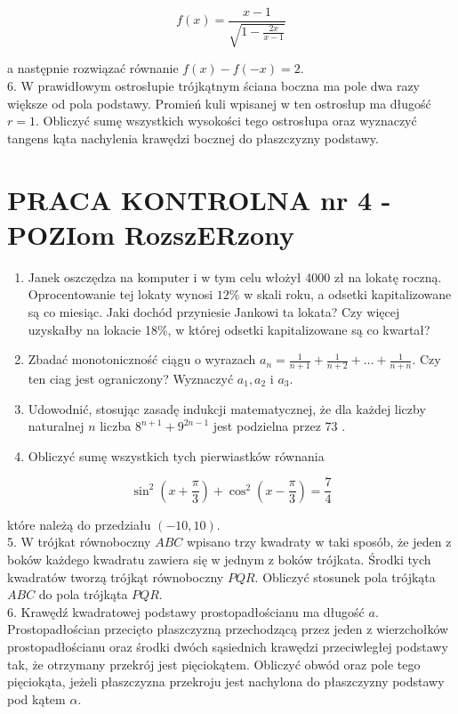 \documentclass[10pt]{article}
\begin{document}
$$
f(x)=\frac{x-1}{\sqrt{1-\frac{2 x}{x-1}}}
$$

a następnie rozwiązać równanie $f(x)-f(-x)=2$.\\
6. W prawidłowym ostrosłupie trójkątnym ściana boczna ma pole dwa razy większe od pola podstawy. Promień kuli wpisanej w ten ostrosłup ma długość $r=1$. Obliczyć sumę wszystkich wysokości tego ostrosłupa oraz wyznaczyć tangens kąta nachylenia krawędzi bocznej do płaszczyzny podstawy.

\section*{PRACA KONTROLNA nr 4 - POZIom RozszERzony}
\begin{enumerate}
  \item Janek oszczędza na komputer i w tym celu włożył 4000 zł na lokatę roczną. Oprocentowanie tej lokaty wynosi $12 \%$ w skali roku, a odsetki kapitalizowane są co miesiąc. Jaki dochód przyniesie Jankowi ta lokata? Czy więcej uzyskałby na lokacie 18\%, w której odsetki kapitalizowane są co kwartał?
  \item Zbadać monotoniczność ciągu o wyrazach $a_{n}=\frac{1}{n+1}+\frac{1}{n+2}+\ldots+\frac{1}{n+n}$. Czy ten ciag jest ograniczony? Wyznaczyć $a_{1}, a_{2}$ i $a_{3}$.
  \item Udowodnić, stosując zasadę indukcji matematycznej, że dla każdej liczby naturalnej $n$ liczba $8^{n+1}+9^{2 n-1}$ jest podzielna przez 73 .
  \item Obliczyć sumę wszystkich tych pierwiastków równania
\end{enumerate}

$$
\sin ^{2}\left(x+\frac{\pi}{3}\right)+\cos ^{2}\left(x-\frac{\pi}{3}\right)=\frac{7}{4}
$$

które należą do przedziału $(-10,10)$.\\
5. W trójkat równoboczny $A B C$ wpisano trzy kwadraty w taki sposób, że jeden z boków każdego kwadratu zawiera się w jednym z boków trójkata. Środki tych kwadratów tworzą trójkąt równoboczny $P Q R$. Obliczyć stosunek pola trójkąta $A B C$ do pola trójkąta $P Q R$.\\
6. Krawędź kwadratowej podstawy prostopadłościanu ma długość $a$. Prostopadłościan przecięto płaszczyzną przechodzącą przez jeden z wierzchołków prostopadłościanu oraz środki dwóch sąsiednich krawędzi przeciwległej podstawy tak, że otrzymany przekrój jest pięciokątem. Obliczyć obwód oraz pole tego pięciokąta, jeżeli płaszczyzna przekroju jest nachylona do płaszczyzny podstawy pod kątem $\alpha$.
\end{document}
